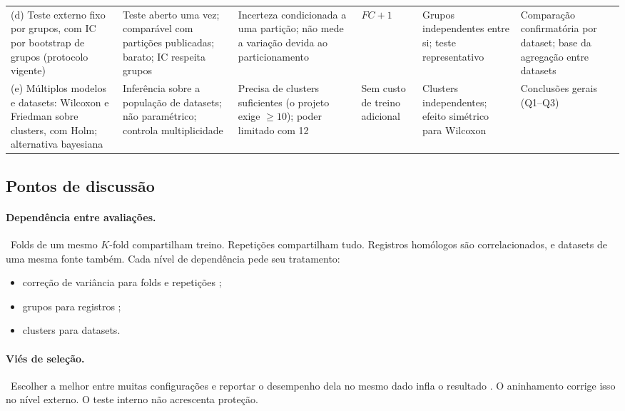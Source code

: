 \documentclass[11pt,a4paper]{article}
\newcommand{\etiqueta}[2]{\tcbox[on line, colback=#1!10, colframe=#1!75!black,
  boxrule=0.4pt, arc=1.2pt, left=1.5pt, right=1.5pt, top=0pt, bottom=0pt,
  fontupper=\sffamily\scriptsize\bfseries]{#2}}
\newcommand{\lit}{\etiqueta{oiBlue}{Literatura}}
\begin{document}
\begin{landscape}
{\begin{tabularx}{\linewidth}{L{2.9cm}YYL{2.4cm}YY}
(d) Teste externo fixo por grupos, com IC por bootstrap de grupos (protocolo vigente) & Teste aberto uma vez; comparável com partições publicadas; barato; IC respeita grupos \citep{field2007} & Incerteza condicionada a uma partição; não mede a variação devida ao particionamento & $FC+1$ & Grupos independentes entre si; teste representativo & Comparação confirmatória por dataset; base da agregação entre datasets \\
(e) Múltiplos modelos e datasets: Wilcoxon e Friedman sobre clusters, com Holm; alternativa bayesiana & Inferência sobre a população de datasets; não paramétrico; controla multiplicidade \citep{demsar2006,holm1979,benavoli2017} & Precisa de clusters suficientes (o projeto exige $\geq10$); poder limitado com 12 & Sem custo de treino adicional & Clusters independentes; efeito simétrico para Wilcoxon & Conclusões gerais (Q1--Q3) \\
\bottomrule
\end{tabularx}
}
\end{landscape}

\subsection{Pontos de discussão}
\label{sec:discussao}

\paragraph{Dependência entre avaliações.}
\lit\ Folds de um mesmo $K$-fold compartilham treino. Repetições compartilham tudo. Registros homólogos são correlacionados, e datasets de uma mesma fonte também. Cada nível de dependência pede seu tratamento:
\begin{itemize}[leftmargin=1.4em]
\item correção de variância para folds e repetições \citep{nadeau2003,bouckaert2004};
\item grupos para registros \citep{teufel2023,roberts2017};
\item clusters para datasets.
\end{itemize}

\paragraph{Viés de seleção.}
\lit\ Escolher a melhor entre muitas configurações e reportar o desempenho dela no mesmo dado infla o resultado \citep{varma2006,cawley2010,krstajic2014}. O aninhamento corrige isso no nível externo. O teste interno não acrescenta proteção.
\end{document}
